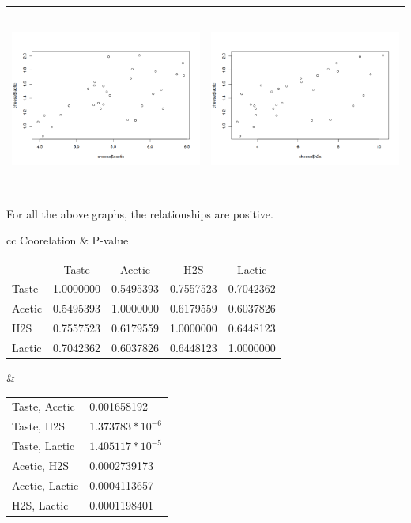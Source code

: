 \documentclass[12pt]{article}
\begin{document}
\begin{center}
\begin{tabular}{cc}
	\includegraphics[width=.5\textwidth, height=60mm, keepaspectratio]{images/1154/1154graph5.png} & \includegraphics[width=.7\textwidth, height=60mm, keepaspectratio]{images/1154/1154graph6.png}\\
	\end{tabular}
	\end{center}\par
	For all the above graphs, the relationships are positive.\par
	
	\begin{tabular}{cc}
	Coorelation & P-value\\
	\begin{tabular}{lcccc}
		& Taste & Acetic & H2S & Lactic\\
		Taste & 1.0000000 & 0.5495393 & 0.7557523 & 0.7042362\\
		Acetic & 0.5495393 & 1.0000000 & 0.6179559 & 0.6037826\\
		H2S & 0.7557523 & 0.6179559 & 1.0000000 & 0.6448123\\
		Lactic & 0.7042362 & 0.6037826 & 0.6448123 & 1.0000000\\
	\end{tabular}
	& 
	\begin{tabular}{ll}
		Taste, Acetic & 0.001658192\\
		Taste, H2S & $1.373783*10^{-6}$\\
		Taste, Lactic & $1.405117*10^{-5}$\\
		Acetic, H2S & 0.0002739173\\
		Acetic, Lactic & 0.0004113657\\
		H2S, Lactic & 0.0001198401\\
	\end{tabular}
	\end{tabular}
\end{document}
